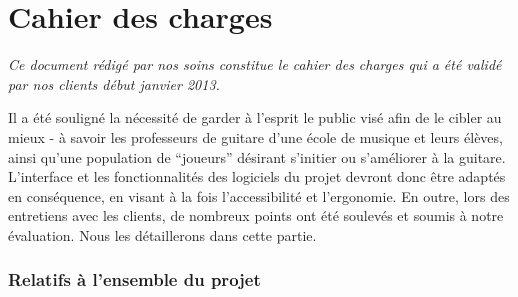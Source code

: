 \documentclass[a4paper,11pt]{article}
\begin{document}
\section*{Cahier des charges}\label{cdc}

\textit{Ce document rédigé par nos soins constitue le cahier des charges qui a été validé par nos clients début janvier 2013.}

\vspace{1cm}

Il a été souligné la nécessité de garder à l'esprit le public visé afin de le cibler au mieux - à savoir les professeurs de guitare d'une école de musique et leurs élèves, ainsi qu'une population de ``joueurs'' désirant s'initier ou s'améliorer à la guitare. L'interface et les fonctionnalités des logiciels du projet devront donc être adaptés en conséquence, en visant à la fois l'accessibilité et l'ergonomie. En outre, lors des entretiens avec les clients, de nombreux points ont été soulevés et soumis à notre évaluation. Nous les détaillerons dans cette partie.

\subsubsection*{Relatifs à l'ensemble du projet}
\end{document}
